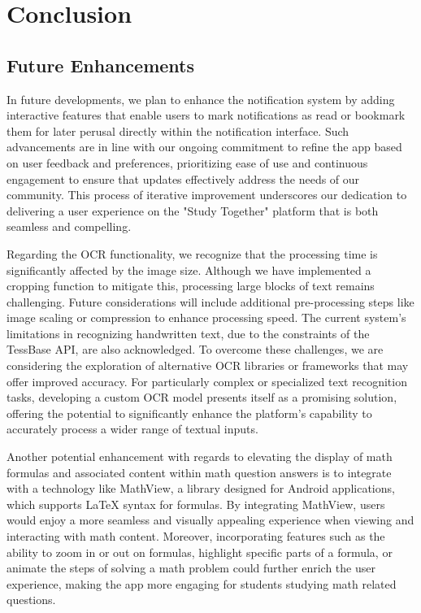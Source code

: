 
\chapter{Conclusion}\label{ch:Conclusion}



\section{Future Enhancements}\label{future_enhancements}

In future developments, we plan to enhance the notification system by adding interactive features that enable users to mark notifications as read or bookmark them for later perusal directly within the notification interface. Such advancements are in line with our ongoing commitment to refine the app based on user feedback and preferences, prioritizing ease of use and continuous engagement to ensure that updates effectively address the needs of our community. This process of iterative improvement underscores our dedication to delivering a user experience on the "Study Together" platform that is both seamless and compelling.

Regarding the OCR functionality, we recognize that the processing time is significantly affected by the image size. Although we have implemented a cropping function to mitigate this, processing large blocks of text remains challenging. Future considerations will include additional pre-processing steps like image scaling or compression to enhance processing speed. The current system's limitations in recognizing handwritten text, due to the constraints of the TessBase API, are also acknowledged. To overcome these challenges, we are considering the exploration of alternative OCR libraries or frameworks that may offer improved accuracy. For particularly complex or specialized text recognition tasks, developing a custom OCR model presents itself as a promising solution, offering the potential to significantly enhance the platform's capability to accurately process a wider range of textual inputs.

Another potential enhancement with regards to elevating the display of math formulas and associated content within math question answers is to integrate with a technology like MathView, a library designed for Android applications, which supports LaTeX syntax for formulas. By integrating MathView, users would enjoy a more seamless and visually appealing experience when viewing and interacting with math content. Moreover, incorporating features such as the ability to zoom in or out on formulas, highlight specific parts of a formula, or animate the steps of solving a math problem could further enrich the user experience, making the app more engaging for students studying math related questions.

